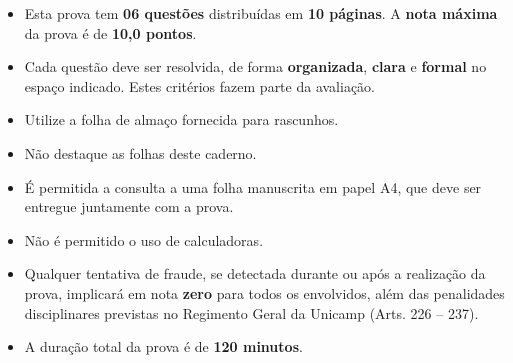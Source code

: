 \documentclass{article}
\begin{document}
\vspace{2cm}


\noindent \hrulefill
\begin{center}
\begin{tcolorbox}[colframe=black,width =7cm,colback=gray!20,arc=0pt]
\end{tcolorbox}
\end{center}

\begin{multicols}{2}
\begin{itemize}
\item Esta prova tem {\bf 06 questões} distribuídas em {\bf 10 páginas}. A {\bf nota máxima} da prova é de {\bf 10,0 pontos}.
\item Cada questão deve ser resolvida, de forma {\bf organizada}, {\bf clara} e {\bf formal} no espaço indicado. Estes critérios fazem parte da avaliação.
\item Utilize a folha de almaço fornecida para rascunhos.
\item Não destaque as folhas deste caderno.
\item É permitida a consulta a uma folha manuscrita em papel A4, que deve ser entregue juntamente com a prova.
\item Não é permitido o uso de calculadoras.
\item Qualquer tentativa de fraude, se detectada durante ou após a realização da prova, implicará em nota {\bf zero} para todos os envolvidos, além das penalidades disciplinares previstas no Regimento Geral da Unicamp (Arts. 226 -- 237).
\item A duração total da prova é de \textbf{120 minutos}.
\end{itemize}
\end{multicols}

\noindent \hrulefill

\pagebreak
\phantom{m} \thispagestyle{empty}

\pagebreak
\end{document}
